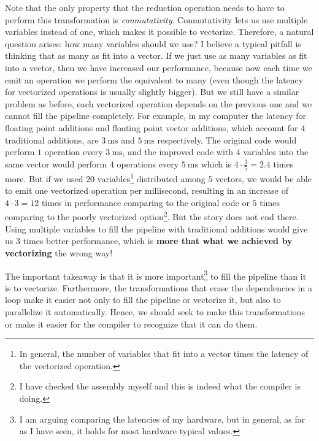 \documentclass[
    12pt, %
]{fphw}
\begin{document}
    Note that the only property that the reduction operation needs to have
to perform this transformation is \textit{conmutativity}.
Conmutativity lets us use multiple variables instead of one,
which makes it possible to vectorize.
Therefore, a natural question arises: how many variables should we use?
I believe a typical pitfall is thinking that as many as fit into a vector.
If we just use as many variables as fit into a vector,
then we have increased our performance,
because now each time we emit an operation we perform the equivalent to many
(even though the latency for vectorized operations is usually slightly bigger).
But we still have a similar problem as before, each vectorized operation depends on
the previous one and we cannot fill the pipeline completely.
For example, in my computer the latency for floating point additions and
floating point vector additions, which account for $4$ traditional additions,
are $\SI{3}{\ms}$ and $\SI{5}{\ms}$ respectively.
The original code would perform $1$ operation every $\SI{3}{\ms}$,
and the improved code with $4$ variables into the same vector would perform
$4$ operations every $\SI{5}{\ms}$ which is $4\cdot \frac{3}{5} = 2.4$ times more.
But if we used $20$ variables\footnote{
    In general, the number of variables that fit into a vector times
    the latency of the vectorized operation.
}
distributed among $5$ vectors,
we would be able to emit one vectorized operation per millisecond,
resulting in an increase of $4 \cdot 3 = 12$ times in performance
comparing to the original code or $5$ times
comparing to the poorly vectorized option\footnote{
    I have checked the assembly myself and this is indeed
    what the compiler is doing.
}.
But the story does not end there.
Using multiple variables to fill the pipeline with traditional additions
would give us $3$ times better performance,
which is \textbf{more that what we achieved by vectorizing} the wrong way!

    The important takeaway is that it is more important\footnote{
    I am arguing comparing the latencies of my hardware,
    but in general, as far as I have seen,
    it holds for most hardware typical values.
} to fill the pipeline than it is to vectorize.
Furthermore, the transformations that erase the dependencies in a loop
make it easier not only to fill the pipeline or vectorize it,
but also to parallelize it automatically.
Hence, we should seek to make this transformations or
make it easier for the compiler to recognize that it can do them.

\newpage
\end{document}
